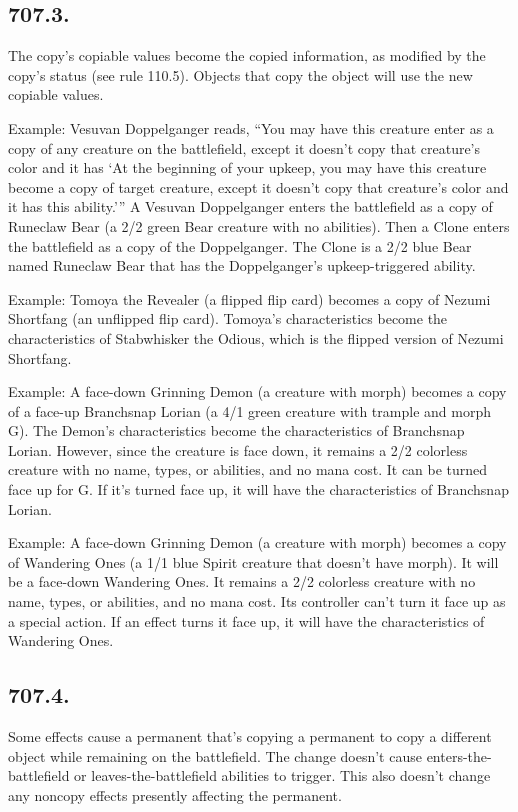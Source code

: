 \subsection*{707.3.}
The copy’s copiable values become the copied information, as modified by the copy’s status (see rule 110.5). Objects that copy the object will use the new copiable values.

Example: Vesuvan Doppelganger reads, “You may have this creature enter as a copy of any creature on the battlefield, except it doesn’t copy that creature’s color and it has ‘At the beginning of your upkeep, you may have this creature become a copy of target creature, except it doesn’t copy that creature’s color and it has this ability.’” A Vesuvan Doppelganger enters the battlefield as a copy of Runeclaw Bear (a 2/2 green Bear creature with no abilities). Then a Clone enters the battlefield as a copy of the Doppelganger. The Clone is a 2/2 blue Bear named Runeclaw Bear that has the Doppelganger’s upkeep-triggered ability.

Example: Tomoya the Revealer (a flipped flip card) becomes a copy of Nezumi Shortfang (an unflipped flip card). Tomoya’s characteristics become the characteristics of Stabwhisker the Odious, which is the flipped version of Nezumi Shortfang.

Example: A face-down Grinning Demon (a creature with morph) becomes a copy of a face-up Branchsnap Lorian (a 4/1 green creature with trample and morph {G}). The Demon’s characteristics become the characteristics of Branchsnap Lorian. However, since the creature is face down, it remains a 2/2 colorless creature with no name, types, or abilities, and no mana cost. It can be turned face up for {G}. If it’s turned face up, it will have the characteristics of Branchsnap Lorian.

Example: A face-down Grinning Demon (a creature with morph) becomes a copy of Wandering Ones (a 1/1 blue Spirit creature that doesn’t have morph). It will be a face-down Wandering Ones. It remains a 2/2 colorless creature with no name, types, or abilities, and no mana cost. Its controller can’t turn it face up as a special action. If an effect turns it face up, it will have the characteristics of Wandering Ones.

\subsection*{707.4.}
Some effects cause a permanent that’s copying a permanent to copy a different object while remaining on the battlefield. The change doesn’t cause enters-the-battlefield or leaves-the-battlefield abilities to trigger. This also doesn’t change any noncopy effects presently affecting the permanent.

